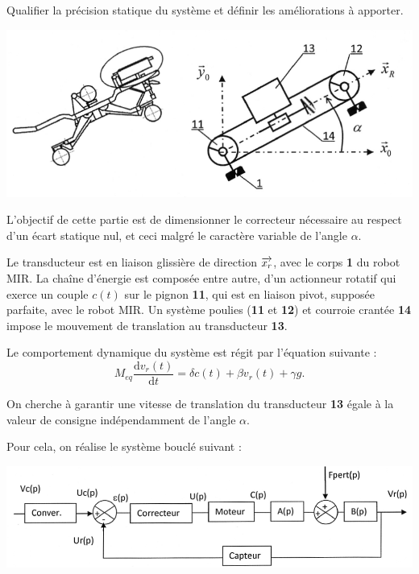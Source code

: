 \documentclass[10pt,fleqn]{article} %
\begin{document}
\begin{multicols}{2}
\begin{obj}
Qualifier la précision statique du système et définir les améliorations à apporter.
\end{obj}

\begin{center}
	\includegraphics[width=\linewidth]{images/fig_12}
\end{center}

L’objectif de cette partie est de dimensionner le correcteur nécessaire au respect d’un écart statique nul, et ceci malgré le caractère variable de l’angle $\alpha$.

Le transducteur est en liaison glissière de direction $\overrightarrow{x_r}$, avec le corps \textbf{1} du robot MIR. La chaîne d’énergie est composée entre autre, d’un actionneur rotatif qui exerce un couple $c(t)$ sur le pignon \textbf{11}, qui est en liaison pivot, supposée parfaite, avec le robot MIR.
Un système poulies (\textbf{11} et \textbf{12}) et courroie crantée \textbf{14} impose le mouvement de translation au transducteur \textbf{13}.
 
 Le comportement dynamique du système est régit par l'équation suivante  :
 $$
 M_{eq}\dfrac{\text{d}v_r(t)}{\text{d}t}=\delta c(t) + \beta v_r(t) + \gamma g.
 $$

On cherche à garantir une vitesse de translation du transducteur \textbf{13} égale à la valeur de consigne indépendamment de l’angle $\alpha$.

Pour cela, on réalise le système bouclé suivant :

\begin{center}
	\includegraphics[width=\linewidth]{images/fig_13}
\end{center}


\end{multicols}
\end{document}
